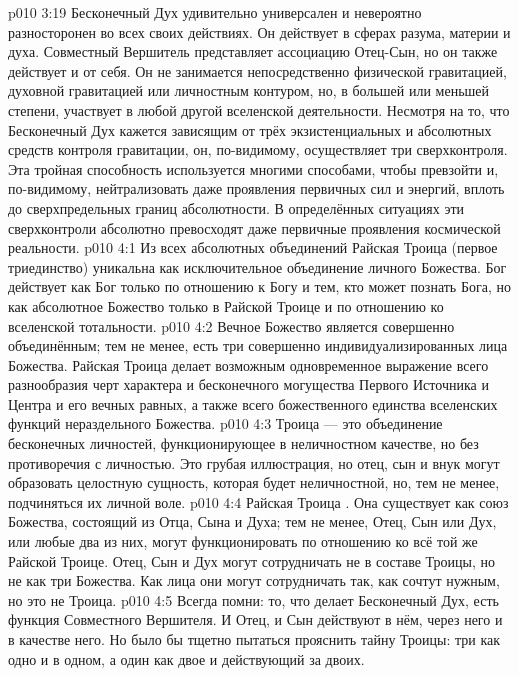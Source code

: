 \vs p010 3:19 \pc Бесконечный Дух удивительно универсален и невероятно разносторонен во всех своих действиях. Он действует в сферах разума, материи и духа. Совместный Вершитель представляет ассоциацию Отец\hyp{}Сын, но он также действует и от себя. Он не занимается непосредственно физической гравитацией, духовной гравитацией или личностным контуром, но, в большей или меньшей степени, участвует в любой другой вселенской деятельности. Несмотря на то, что Бесконечный Дух кажется зависящим от трёх экзистенциальных и абсолютных средств контроля гравитации, он, по\hyp{}видимому, осуществляет три сверхконтроля. Эта тройная способность используется многими способами, чтобы превзойти и, по\hyp{}видимому, нейтрализовать даже проявления первичных сил и энергий, вплоть до сверхпредельных границ абсолютности. В определённых ситуациях эти сверхконтроли абсолютно превосходят даже первичные проявления космической реальности.
\vs p010 4:1 Из всех абсолютных объединений Райская Троица (первое триединство) уникальна как исключительное объединение личного Божества. Бог действует как Бог только по отношению к Богу и тем, кто может познать Бога, но как абсолютное Божество только в Райской Троице и по отношению ко вселенской тотальности.
\vs p010 4:2 \pc Вечное Божество является совершенно объединённым; тем не менее, есть три совершенно индивидуализированных лица Божества. Райская Троица делает возможным одновременное выражение всего разнообразия черт характера и бесконечного могущества Первого Источника и Центра и его вечных равных, а также всего божественного единства вселенских функций нераздельного Божества.
\vs p010 4:3 Троица --- это объединение бесконечных личностей, функционирующее в неличностном качестве, но без противоречия с личностью. Это грубая иллюстрация, но отец, сын и внук могут образовать целостную сущность, которая будет неличностной, но, тем не менее, подчиняться их личной воле.
\vs p010 4:4 Райская Троица . Она существует как союз Божества, состоящий из Отца, Сына и Духа; тем не менее, Отец, Сын или Дух, или любые два из них, могут функционировать по отношению ко всё той же Райской Троице. Отец, Сын и Дух могут сотрудничать не в составе Троицы, но не как три Божества. Как лица они могут сотрудничать так, как сочтут нужным, но это не Троица.
\vs p010 4:5 \pc Всегда помни: то, что делает Бесконечный Дух, есть функция Совместного Вершителя. И Отец, и Сын действуют в нём, через него и в качестве него. Но было бы тщетно пытаться прояснить тайну Троицы: три как одно и в одном, а один как двое и действующий за двоих.
